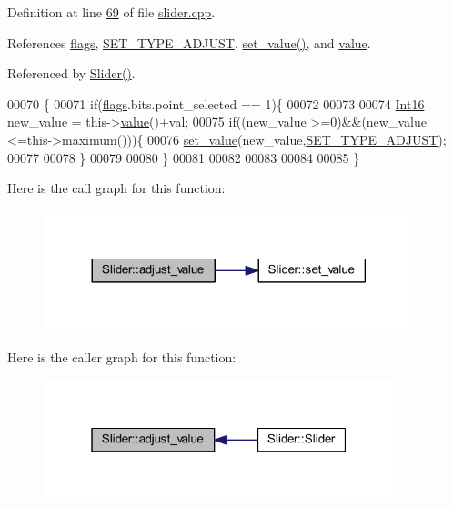 Definition at line \hyperlink{a00133_source_l00069}{69} of file \hyperlink{a00133_source}{slider.\+cpp}.



References \hyperlink{a00077_ade6449558d429b66e5ed1381bc9b9060}{flags}, \hyperlink{a00090_source_l00049}{S\+E\+T\+\_\+\+T\+Y\+P\+E\+\_\+\+A\+D\+J\+U\+S\+T}, \hyperlink{a00133_source_l00102}{set\+\_\+value()}, and \hyperlink{a00116_source_l00145}{value}.



Referenced by \hyperlink{a00133_source_l00014}{Slider()}.


\begin{DoxyCode}
00070 \{
00071     \textcolor{keywordflow}{if}(\hyperlink{a00077_ade6449558d429b66e5ed1381bc9b9060}{flags}.bits.point\_selected == 1)\{
00072 
00073 
00074     \hyperlink{a00004_a3985266aecb120f269789241c170850c}{Int16} new\_value = this->\hyperlink{a00116_aee90379adb0307effb138f4871edbc5c}{value}()+val;
00075     \textcolor{keywordflow}{if}((new\_value >=0)&&(new\_value <=this->maximum()))\{
00076         \hyperlink{a00077_ae3010d3de02715db2f443560d7d2a27b}{set\_value}(new\_value,\hyperlink{a00090_a16b6b7b5ad68ec0dd62a3c9e97f88adb}{SET\_TYPE\_ADJUST});
00077 
00078     \}
00079 
00080     \}
00081 
00082 
00083 
00084 
00085 \}
\end{DoxyCode}


Here is the call graph for this function\+:
\nopagebreak
\begin{figure}[H]
\begin{center}
\leavevmode
\includegraphics[width=305pt]{d1/d09/a00077_a521ac5143857dd652a0bafa77389fa81_cgraph}
\end{center}
\end{figure}




Here is the caller graph for this function\+:
\nopagebreak
\begin{figure}[H]
\begin{center}
\leavevmode
\includegraphics[width=289pt]{d1/d09/a00077_a521ac5143857dd652a0bafa77389fa81_icgraph}
\end{center}
\end{figure}


